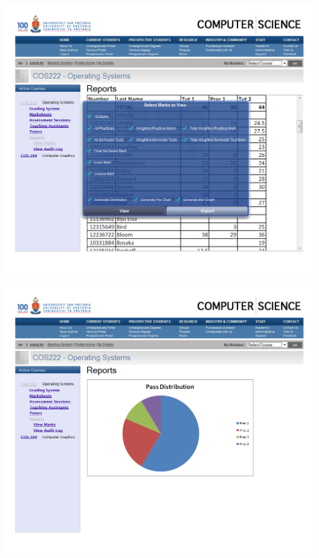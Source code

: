 \documentclass[12pt,a4paper]{article}
\begin{document}
\includegraphics[scale=0.3]{./WebUI/11.png}\\\\
\includegraphics[scale=0.3]{./WebUI/12.png}\\\\
\end{document}

